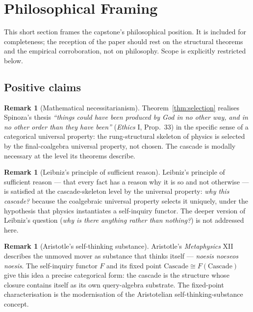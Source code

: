 \documentclass[11pt, a4paper]{amsart}
\theoremstyle{definition}
\newtheorem{remark}[theorem]{Remark}
\begin{document}
\section{Philosophical Framing}
\label{sec:philosophy}

This short section frames the capstone's philosophical
position. It is included for completeness; the reception of the
paper should rest on the structural theorems and the empirical
corroboration, not on philosophy. Scope is explicitly restricted
below.

\subsection{Positive claims}

\begin{remark}[Mathematical necessitarianism]
\label{rmk:pos-spinoza}
Theorem~\ref{thm:selection} realises Spinoza's thesis
\emph{``things could have been produced by God in no other way,
and in no other order than they have been''} (\emph{Ethics} I,
Prop.~33) in the specific sense of a categorical universal
property: the rung-structural skeleton of physics is selected by
the final-coalgebra universal property, not chosen. The cascade
is modally necessary at the level its theorems describe.
\end{remark}

\begin{remark}[Leibniz's principle of sufficient reason]
\label{rmk:pos-leibniz}
Leibniz's principle of sufficient reason — that every fact has a
reason why it is so and not otherwise — is satisfied at the
cascade-skeleton level by the universal property:
\emph{why this cascade?} because the coalgebraic universal
property selects it uniquely, under the hypothesis that physics
instantiates a self-inquiry functor. The deeper version of
Leibniz's question (\emph{why is there anything rather than
nothing?}) is not addressed here.
\end{remark}

\begin{remark}[Aristotle's self-thinking substance]
\label{rmk:pos-aristotle}
Aristotle's \emph{Metaphysics} XII describes the unmoved mover
as substance that thinks itself — \emph{noesis noeseos noesis}.
The self-inquiry functor $F$ and its fixed point
$\mathrm{Cascade} \cong F(\mathrm{Cascade})$ give this idea a
precise categorical form: the cascade is the structure whose
closure contains itself as its own query-algebra substrate. The
fixed-point characterisation is the modernisation of the
Aristotelian self-thinking-substance concept.
\end{remark}
\end{document}
